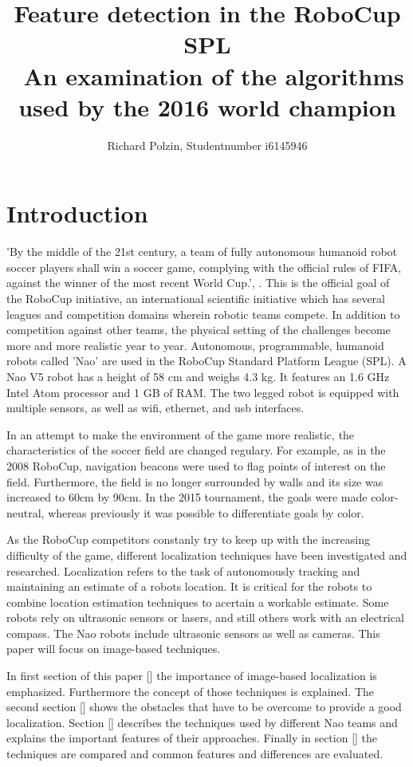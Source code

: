 \documentclass[12pt, a4paper, doc]{apa6}
\author{Richard Polzin, Studentnumber i6145946}
\affiliation{\today, Academic Writing, Tutor: Denise McAllister}
\title{Feature detection in the RoboCup SPL \\\ \large{An examination of the algorithms used by the 2016 world champion}}
\begin{document}
  \maketitle
  \setlength{\parindent}{0pt}

  \section{Introduction}
  \noindent 'By the middle of the 21st century, a team of fully autonomous humanoid robot soccer players shall win a soccer game, complying with the official rules of FIFA, against the winner of the most recent World Cup.', \cite{Kitano95robocup:the}. This is the official goal of the RoboCup initiative, an international scientific initiative which has several leagues and competition domains wherein robotic teams compete. In addition to competition against other teams, the physical setting of the challenges become more and more realistic year to year. Autonomous, programmable, humanoid robots called 'Nao' are used in the RoboCup Standard Platform League (SPL). A Nao V5 robot has a height of 58 cm and weighs 4.3 kg. It features an 1.6 GHz Intel Atom processor and 1 GB of RAM. The two legged robot is equipped with multiple sensors, as well as wifi, ethernet, and usb interfaces.

  In an attempt to make the environment of the game more realistic, the characteristics of the soccer field are changed regulary. For example, as in the 2008 RoboCup, navigation beacons were used to flag points of interest on the field. Furthermore, the field is no longer surrounded by walls and its size was increased to 60cm by 90cm. In the 2015 tournament, the goals were made color-neutral, whereas previously it was possible to differentiate goals by color.

  As the RoboCup competitors constanly try to keep up with the increasing difficulty of the game, different localization techniques have been investigated and researched. Localization refers to the task of autonomously tracking and maintaining an estimate of a robots location. It is critical for the robots to combine location estimation techniques to acertain a workable estimate. Some robots rely on ultrasonic sensors or lasers, and still others work with an electrical compass. The Nao robots include ultrasonic sensors as well as cameras. This paper will focus on image-based techniques.

  In first section of this paper [] the importance of image-based localization is emphasized. Furthermore the concept of those techniques is explained. The second section [] shows the obstacles that have to be overcome to provide a good localization. Section [] describes the techniques used by different Nao teams and explains the important features of their approaches. Finally in section [] the techniques are compared and common features and differences are evaluated.
\end{document}
